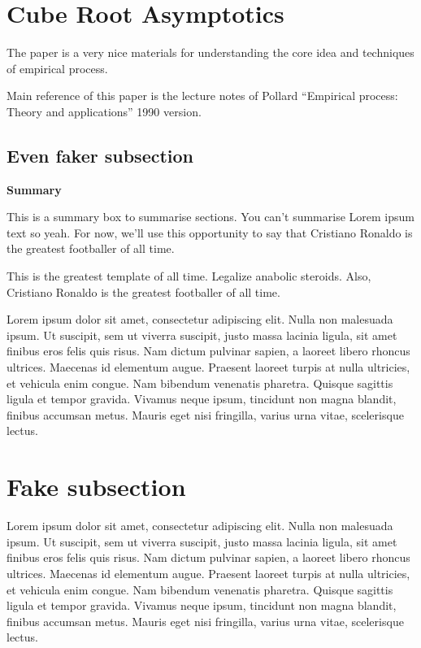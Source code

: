 \section{Cube Root Asymptotics}
The paper is a very nice materials for understanding the core idea and techniques of empirical process.

Main reference of this paper is the lecture notes of Pollard ``Empirical process: Theory and applications'' 1990 version.

\marginpar{
  \begin{marginnotes}
    
  \end{marginnotes}
}

\subsection{Even faker subsection}
\lipsum[2]
\begin{summary}
\textbf{Summary} 

This is a summary box to summarise sections. 
You can't summarise Lorem ipsum text so yeah. For now, we'll use this opportunity to say that Cristiano Ronaldo is the greatest footballer of all time.
\end{summary}
\lipsum[1]
This is the greatest template of all time. Legalize anabolic steroids.
Also, Cristiano Ronaldo is the greatest footballer of all time.

Lorem ipsum dolor sit amet, consectetur adipiscing elit. Nulla non malesuada ipsum. Ut suscipit, sem ut viverra suscipit, justo massa lacinia ligula, sit amet finibus eros felis quis risus.
Nam dictum pulvinar sapien, a laoreet libero rhoncus ultrices. Maecenas id elementum augue. Praesent laoreet turpis at nulla ultricies, et vehicula enim congue. Nam bibendum venenatis pharetra. Quisque sagittis ligula et tempor gravida. Vivamus neque ipsum, tincidunt non magna blandit, finibus accumsan metus. Mauris eget nisi fringilla, varius urna vitae, scelerisque lectus. 
\clearpage
\section{Fake subsection}
Lorem ipsum dolor sit amet, consectetur adipiscing elit. Nulla non malesuada ipsum. Ut suscipit, sem ut viverra suscipit, justo massa lacinia ligula, sit amet finibus eros felis quis risus.
Nam dictum pulvinar sapien, a laoreet libero rhoncus ultrices. Maecenas id elementum augue. Praesent laoreet turpis at nulla ultricies, et vehicula enim congue. Nam bibendum venenatis pharetra. Quisque sagittis ligula et tempor gravida. Vivamus neque ipsum, tincidunt non magna blandit, finibus accumsan metus. Mauris eget nisi fringilla, varius urna vitae, scelerisque lectus. 

